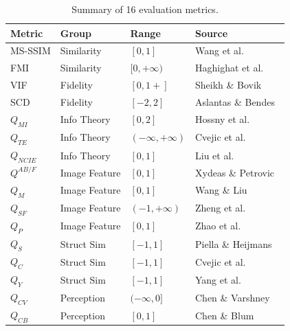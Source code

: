 \documentclass[a4paper,12pt]{article}
\begin{document}
\begin{table}[H]
\centering
\caption{Summary of 16 evaluation metrics.}
\label{tab:metrics-summary}
\renewcommand{\arraystretch}{1.25}
\small
\begin{tabular}{llll}
\toprule
\textbf{Metric} & \textbf{Group} & \textbf{Range} & \textbf{Source} \\
\midrule
MS-SSIM    & Similarity & $[0,1]$              & Wang et al.~\cite{wang2003} \\
FMI        & Similarity & $[0,+\infty)$        & Haghighat et al.~\cite{haghighat2011} \\
\midrule
VIF        & Fidelity   & $[0,1+]$             & Sheikh \& Bovik~\cite{sheikh2006} \\
SCD        & Fidelity   & $[-2,2]$             & Aslantas \& Bendes~\cite{aslantas2015} \\
\midrule
$Q_{MI}$   & Info Theory    & $[0,2]$              & Hossny et al.~\cite{hossny2008} \\
$Q_{TE}$   & Info Theory    & $(-\infty,+\infty)$  & Cvejic et al.~\cite{cvejic2006} \\
$Q_{NCIE}$ & Info Theory    & $[0,1]$              & Liu et al.~\cite{liu2012} \\
\midrule
$Q^{AB/F}$ & Image Feature  & $[0,1]$              & Xydeas \& Petrovic~\cite{xydeas2000} \\
$Q_M$      & Image Feature  & $[0,1]$              & Wang \& Liu~\cite{wang2008} \\
$Q_{SF}$   & Image Feature  & $(-1,+\infty)$       & Zheng et al.~\cite{zheng2007} \\
$Q_P$      & Image Feature  & $[0,1]$              & Zhao et al.~\cite{zhao2007} \\
\midrule
$Q_S$      & Struct Sim     & $[-1,1]$    & Piella \& Heijmans~\cite{piella2003} \\
$Q_C$      & Struct Sim     & $[-1,1]$    & Cvejic et al.~\cite{cvejic2005} \\
$Q_Y$      & Struct Sim     & $[-1,1]$    & Yang et al.~\cite{yang2008} \\
\midrule
$Q_{CV}$   & Perception     & $(-\infty,0]$  & Chen \& Varshney~\cite{chen2007} \\
$Q_{CB}$   & Perception     & $[0,1]$        & Chen \& Blum~\cite{chen2009} \\
\bottomrule
\end{tabular}
\end{table}

\newpage
\end{document}
